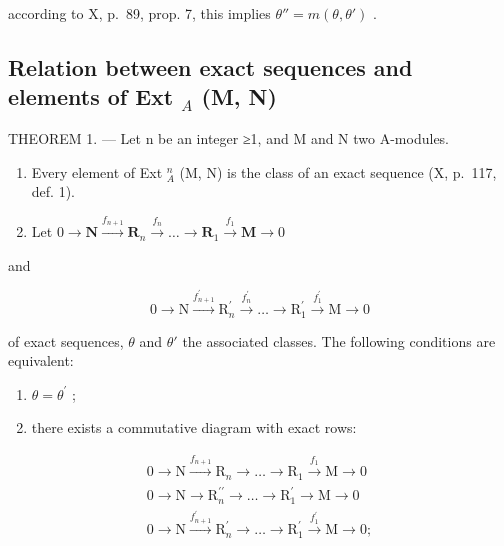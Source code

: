 according to X, p.~89, prop. 7, this implies \(\theta'' = m(\theta, \theta')\) .

\subsection{\texorpdfstring{Relation between exact sequences and elements of Ext \(_{A}\) (M, N)}{Relation between exact sequences and elements of Ext \_\{A\} (M, N)}}

THEOREM 1. --- Let n be an integer ≥1, and M and N two A-modules.

\begin{enumerate}
\def\labelenumi{\alph{enumi})}
\item
  Every element of Ext \(_{A}^{n}\) (M, N) is the class of an exact sequence (X, p.~117, def. 1).
\item
  Let \(0 \to \mathbf{N} \xrightarrow{f_{n+1}} \mathbf{R}_n \xrightarrow{f_n} \ldots \to \mathbf{R}_1 \xrightarrow{f_1} \mathbf{M} \to 0\)
\end{enumerate}

and

\[
0 \rightarrow \mathrm{N} \xrightarrow {f _ {n + 1} ^ {\prime}} \mathrm{R} _ {n} ^ {\prime} \xrightarrow {f _ {n} ^ {\prime}} \dots \rightarrow \mathrm{R} _ {1} ^ {\prime} \xrightarrow {f _ {1} ^ {\prime}} \mathrm{M} \rightarrow 0
\]

of exact sequences, \(\theta\) and \(\theta'\) the associated classes. The following conditions are equivalent:

\begin{enumerate}
\def\labelenumi{(\roman{enumi})}
\item
  \(\theta = \theta^{\prime}\) ;
\item
  there exists a commutative diagram with exact rows:
\end{enumerate}

\[
\begin{array}{c} 0 \longrightarrow \mathrm{N} \xrightarrow {f _ {n + 1}} \mathrm{R} _ {n} \longrightarrow \dots \longrightarrow \mathrm{R} _ {1} \xrightarrow {f _ {1}} \mathrm{M} \longrightarrow 0 \\ 0 \longrightarrow \mathrm{N} \longrightarrow \mathrm{R} _ {n} ^ {\prime \prime} \longrightarrow \dots \longrightarrow \mathrm{R} _ {1} ^ {\prime} \longrightarrow \mathrm{M} \longrightarrow 0 \\ 0 \longrightarrow \mathrm{N} \xrightarrow {f _ {n + 1} ^ {\prime}} \mathrm{R} _ {n} ^ {\prime} \longrightarrow \dots \longrightarrow \mathrm{R} _ {1} ^ {\prime} \xrightarrow {f _ {1} ^ {\prime}} \mathrm{M} \longrightarrow 0; \end{array}
\]

